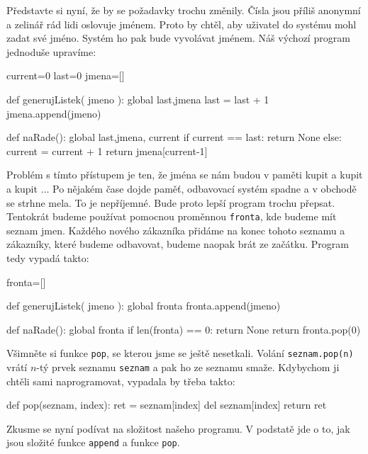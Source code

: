 Představte si nyní, že by se požadavky trochu změnily. Čísla jsou příliš anonymní a zelinář rád lidi oslovuje jménem. Proto by chtěl,
aby uživatel do systému mohl zadat své jméno. Systém ho pak bude vyvolávat jménem. Náš výchozí program jednoduše upravíme:

\begin{python}
current=0
last=0
jmena=[]

def generujListek( jmeno ):
    global last,jmena
    last = last + 1
    jmena.append(jmeno)

def naRade():
    global last,jmena, current
    if current == last:
        return None
    else:
        current = current + 1
    return jmena[current-1]
\end{python}

Problém s tímto přístupem je ten, že jména se nám budou v paměti kupit a kupit a kupit $\ldots$ Po nějakém čase dojde paměť, odbavovací systém spadne a
v obchodě se strhne mela. To je nepříjemné. Bude proto lepší program trochu přepsat. Tentokrát budeme používat pomocnou proměnnou {\tt fronta}, kde
budeme mít seznam jmen. Každého nového zákazníka přidáme na konec tohoto seznamu a zákazníky, které budeme odbavovat, budeme naopak brát ze začátku.
Program tedy vypadá takto:

\begin{python}
fronta=[]

def generujListek( jmeno ):
    global fronta
    fronta.append(jmeno)

def naRade():
    global fronta
    if len(fronta) == 0:
        return None
    return fronta.pop(0)
\end{python}

Všimněte si funkce {\tt pop}, se kterou jsme se ještě nesetkali. Volání {\tt seznam.pop(n)} vrátí $n$-tý prvek seznamu {\tt seznam}
a pak ho ze seznamu smaže. Kdybychom ji chtěli sami naprogramovat, vypadala by třeba takto:

\begin{python}
def pop(seznam, index):
    ret = seznam[index]
    del seznam[index]
    return ret
\end{python}

Zkusme se nyní podívat na složitost našeho programu. V podstatě jde o to, jak jsou složité funkce {\tt append} a funkce {\tt pop}.

